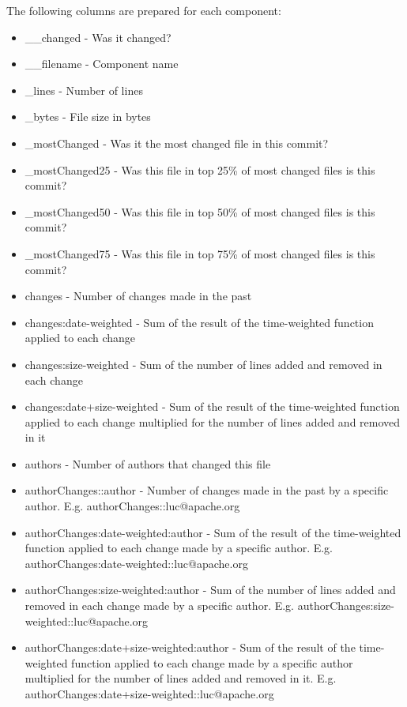 The following columns are prepared for each component:
%
\begin{itemize}
\item \_\_changed - Was it changed?
\item \_\_filename - Component name
\item \_lines - Number of lines
\item \_bytes - File size in bytes
\item \_mostChanged - Was it the most changed file in this commit?
\item \_mostChanged25 - Was this file in top 25\% of most changed files is this commit?
\item \_mostChanged50 - Was this file in top 50\% of most changed files is this commit?
\item \_mostChanged75 - Was this file in top 75\% of most changed files is this commit?
\item changes - Number of changes made in the past
\item changes:date-weighted - Sum of the result of the time-weighted function applied to each change
\item changes:size-weighted - Sum of the number of lines added and removed in each change
\item changes:date+size-weighted - Sum of the result of the time-weighted function applied to each change multiplied for the number of lines added and removed in it
\item authors - Number of authors that changed this file
\item authorChanges::{author} - Number of changes made in the past by a specific author. E.g. authorChanges::luc@apache.org
\item authorChanges:date-weighted:{author} - Sum of the result of the time-weighted function applied to each change made by a specific author. E.g. authorChanges:date-weighted::luc@apache.org
\item authorChanges:size-weighted:{author} - Sum of the number of lines added and removed in each change made by a specific author. E.g. authorChanges:size-weighted::luc@apache.org
\item authorChanges:date+size-weighted:{author} - Sum of the result of the time-weighted function applied to each change made by a specific author multiplied for the number of lines added and removed in it. E.g. authorChanges:date+size-weighted::luc@apache.org
\end{itemize}


